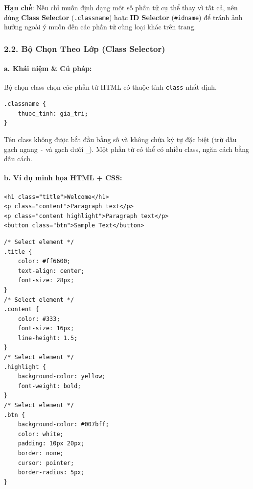 \documentclass[11pt,oneside]{book}
\newcommand{\codeinline}[1]{\textcolor{accentOrange}{\texttt{#1}}}
\begin{document}
\begin{warnBox}
\textbf{Hạn chế}: Nếu chỉ muốn định dạng một số phần tử cụ thể thay vì tất cả, nên dùng \textbf{Class Selector} (\codeinline{.classname}) hoặc \textbf{ID Selector} (\codeinline{\#idname}) để tránh ảnh hưởng ngoài ý muốn đến các phần tử cùng loại khác trên trang.
\end{warnBox}

\subsubsection{2.2. Bộ Chọn Theo Lớp (Class Selector)}

\paragraph{a. Khái niệm \& Cú pháp:}
Bộ chọn class chọn các phần tử HTML có thuộc tính \codeinline{class} nhất định.
\begin{codeWindow}
\begin{lstlisting}[language=CSS3]
.classname {
    thuoc_tinh: gia_tri;
}
\end{lstlisting}
\end{codeWindow}
\begin{noteBox}
Tên class không được bắt đầu bằng số và không chứa ký tự đặc biệt (trừ dấu gạch ngang \codeinline{-} và gạch dưới \codeinline{\_}). Một phần tử có thể có nhiều class, ngăn cách bằng dấu cách.
\end{noteBox}

\paragraph{b. Ví dụ minh họa HTML + CSS:}
\begin{codeWindow}
\begin{lstlisting}[language=HTML5]
<h1 class="title">Welcome</h1>
<p class="content">Paragraph text</p>
<p class="content highlight">Paragraph text</p>
<button class="btn">Sample Text</button>
\end{lstlisting}

\begin{lstlisting}[language=CSS3]
/* Select element */
.title {
    color: #ff6600;
    text-align: center;
    font-size: 28px;
}
/* Select element */
.content {
    color: #333;
    font-size: 16px;
    line-height: 1.5;
}
/* Select element */
.highlight {
    background-color: yellow;
    font-weight: bold;
}
/* Select element */
.btn {
    background-color: #007bff;
    color: white;
    padding: 10px 20px;
    border: none;
    cursor: pointer;
    border-radius: 5px;
}
\end{lstlisting}
\end{codeWindow}
\end{document}
